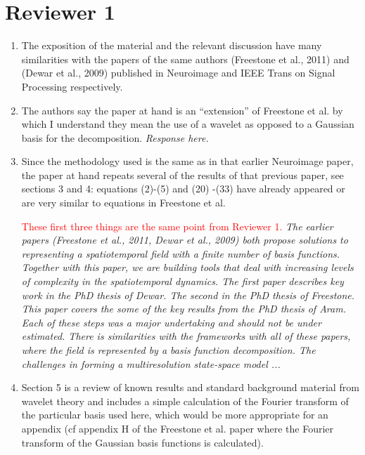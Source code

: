 \documentclass{article}
\newcommand{\dean}[1]{\textcolor{red}{#1}}
\begin{document}
    \section{Reviewer 1}
    


    \begin{enumerate}
        \item The exposition of the material and the relevant discussion have many similarities with the papers of the same authors (Freestone et al., 2011) and (Dewar et al., 2009) published in Neuroimage and IEEE Trans on Signal Processing  respectively.  
				\item The authors say the paper at hand is an ``extension'' of Freestone et al. by which I understand they mean the use of a wavelet as opposed to a Gaussian basis for the decomposition.
				\emph{Response here.} 
				
				\item Since the methodology used is the same as in that earlier Neuroimage paper, the paper at hand repeats several of  the results of that previous paper, see sections 3 and 4: equations (2)-(5) and (20) -(33) have already appeared or are very similar to equations in Freestone et al.                                                            
				 
\dean{These first three things are the same point from Reviewer 1.}
	\emph{The earlier papers (Freestone et al., 2011, Dewar et al., 2009) both propose solutions to representing a spatiotemporal field with a finite number of basis functions. Together with this paper, we are building tools that deal with increasing levels of complexity in the spatiotemporal dynamics. The first paper describes key work in the PhD thesis of Dewar. The second in the PhD thesis of Freestone. This paper covers the some of the key results from the PhD thesis of Aram. Each of these steps was a major undertaking and should not be under estimated. There is similarities with the frameworks with all of these papers, where the field is represented by a basis function decomposition. The challenges in forming a multiresolution state-space model ... }
	        
        \item Section 5 is a review of known results and standard background material from wavelet theory and includes a simple calculation of the Fourier transform of the particular basis used here, which would be more appropriate for an appendix (cf appendix H of the Freestone et al. paper where the Fourier transform of the Gaussian basis functions is calculated).


\end{enumerate}
\end{document}
